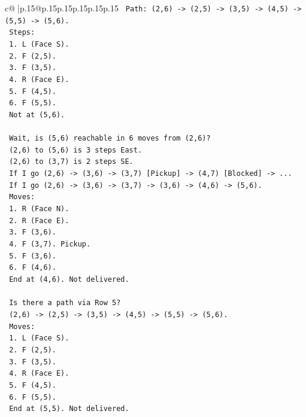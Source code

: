 \documentclass{article}
\begin{document}
{\begin{supertabular}{c@{$\;$}|p{.15\linewidth}@{}p{.15\linewidth}p{.15\linewidth}p{.15\linewidth}p{.15\linewidth}p{.15\linewidth}}
{{{\texttt{   Path: (2,6) {-}> (2,5) {-}> (3,5) {-}> (4,5) {-}> (5,5) {-}> (5,6).} \\
\texttt{   Steps:} \\
\texttt{   1. L (Face S).} \\
\texttt{   2. F (2,5).} \\
\texttt{   3. F (3,5).} \\
\texttt{   4. R (Face E).} \\
\texttt{   5. F (4,5).} \\
\texttt{   6. F (5,5).} \\
\texttt{   Not at (5,6).} \\
\\ 
\texttt{   Wait, is (5,6) reachable in 6 moves from (2,6)?} \\
\texttt{   (2,6) to (5,6) is 3 steps East.} \\
\texttt{   (2,6) to (3,7) is 2 steps SE.} \\
\texttt{   If I go (2,6) {-}> (3,6) {-}> (3,7) {[}Pickup{]} {-}> (4,7) {[}Blocked{]} {-}> ...} \\
\texttt{   If I go (2,6) {-}> (3,6) {-}> (3,7) {-}> (3,6) {-}> (4,6) {-}> (5,6).} \\
\texttt{   Moves:} \\
\texttt{   1. R (Face N).} \\
\texttt{   2. R (Face E).} \\
\texttt{   3. F (3,6).} \\
\texttt{   4. F (3,7). Pickup.} \\
\texttt{   5. F (3,6).} \\
\texttt{   6. F (4,6).} \\
\texttt{   End at (4,6). Not delivered.} \\
\\ 
\texttt{   Is there a path via Row 5?} \\
\texttt{   (2,6) {-}> (2,5) {-}> (3,5) {-}> (4,5) {-}> (5,5) {-}> (5,6).} \\
\texttt{   Moves:} \\
\texttt{   1. L (Face S).} \\
\texttt{   2. F (2,5).} \\
\texttt{   3. F (3,5).} \\
\texttt{   4. R (Face E).} \\
\texttt{   5. F (4,5).} \\
\texttt{   6. F (5,5).} \\
\texttt{   End at (5,5). Not delivered.} \\
}}}
\end{supertabular}}
\end{document}
